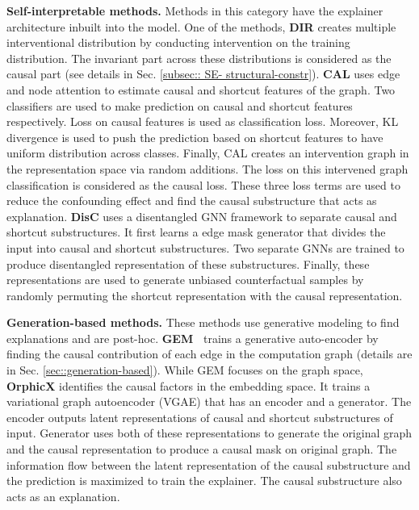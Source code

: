 \textbf{Self-interpretable methods.} Methods in this category have the explainer architecture inbuilt into the model. 
One of the methods, \textbf{DIR} \cite{D_invariant_rationale} creates multiple interventional distribution by conducting intervention on the training distribution. The invariant part across these distributions is considered as the causal part (see details in Sec. \ref{subsec:: SE- structural-constr}). \textbf{CAL} \cite{causal-attention} uses edge and node attention to estimate causal and shortcut features of the graph. Two classifiers are used to make prediction on causal and shortcut features respectively. Loss on causal features is used as classification loss. Moreover, KL divergence is used to push the prediction based on shortcut features to have uniform distribution across classes. Finally, CAL creates an intervention graph in the representation space via random additions. The loss on this intervened graph classification is considered as the causal loss. These three loss terms are used to reduce the confounding effect and find the causal substructure that acts as explanation. \textbf{DisC} \cite{causal-debiasing} uses a disentangled GNN framework to separate causal and shortcut substructures. It first learns a edge mask generator that divides the input into causal and shortcut substructures. Two separate GNNs are trained to produce disentangled representation of these substructures. Finally, these representations are used to generate unbiased counterfactual samples by randomly permuting the shortcut representation with the causal representation. %

\textbf{Generation-based methods.} These methods use generative modeling to find explanations and are post-hoc. \textbf{GEM~\cite{Gen-causal}} trains a generative auto-encoder by finding the causal contribution of each edge in the computation graph (details are in Sec. \ref{sec::generation-based}). While GEM focuses on the graph space, \textbf{OrphicX} \cite{causal-orphicx} identifies the causal factors in the embedding space. It trains a variational graph autoencoder (VGAE) that has an encoder and a generator. The encoder outputs latent representations of causal and shortcut substructures of input. Generator uses both of these representations to generate the original graph and the causal representation to produce a causal mask on original graph. The information flow between the latent representation of the causal substructure and the prediction is maximized to train the explainer. The causal substructure also acts as an explanation.

